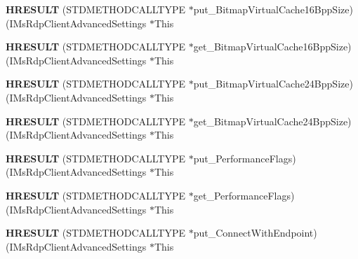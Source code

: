 \begin{DoxyCompactItemize}
{\bfseries H\+R\+E\+S\+U\+LT} (S\+T\+D\+M\+E\+T\+H\+O\+D\+C\+A\+L\+L\+T\+Y\+PE $\ast$put\+\_\+\+Bitmap\+Virtual\+Cache16\+Bpp\+Size)(I\+Ms\+Rdp\+Client\+Advanced\+Settings $\ast$This
\item 
\mbox{\label{struct_i_ms_rdp_client_advanced_settings_vtbl_af89a6a6150667c376bf028de0a6f4245}} 
{\bfseries H\+R\+E\+S\+U\+LT} (S\+T\+D\+M\+E\+T\+H\+O\+D\+C\+A\+L\+L\+T\+Y\+PE $\ast$get\+\_\+\+Bitmap\+Virtual\+Cache16\+Bpp\+Size)(I\+Ms\+Rdp\+Client\+Advanced\+Settings $\ast$This
\item 
\mbox{\label{struct_i_ms_rdp_client_advanced_settings_vtbl_a189c57a9df395151aa237519e09bb79a}} 
{\bfseries H\+R\+E\+S\+U\+LT} (S\+T\+D\+M\+E\+T\+H\+O\+D\+C\+A\+L\+L\+T\+Y\+PE $\ast$put\+\_\+\+Bitmap\+Virtual\+Cache24\+Bpp\+Size)(I\+Ms\+Rdp\+Client\+Advanced\+Settings $\ast$This
\item 
\mbox{\label{struct_i_ms_rdp_client_advanced_settings_vtbl_a1fb865c4695532877e7f2684cab57653}} 
{\bfseries H\+R\+E\+S\+U\+LT} (S\+T\+D\+M\+E\+T\+H\+O\+D\+C\+A\+L\+L\+T\+Y\+PE $\ast$get\+\_\+\+Bitmap\+Virtual\+Cache24\+Bpp\+Size)(I\+Ms\+Rdp\+Client\+Advanced\+Settings $\ast$This
\item 
\mbox{\label{struct_i_ms_rdp_client_advanced_settings_vtbl_aa298f6bbfb386d6c8b8ef7824c1a7a74}} 
{\bfseries H\+R\+E\+S\+U\+LT} (S\+T\+D\+M\+E\+T\+H\+O\+D\+C\+A\+L\+L\+T\+Y\+PE $\ast$put\+\_\+\+Performance\+Flags)(I\+Ms\+Rdp\+Client\+Advanced\+Settings $\ast$This
\item 
\mbox{\label{struct_i_ms_rdp_client_advanced_settings_vtbl_a76b8162d9272e958636bef995271eabf}} 
{\bfseries H\+R\+E\+S\+U\+LT} (S\+T\+D\+M\+E\+T\+H\+O\+D\+C\+A\+L\+L\+T\+Y\+PE $\ast$get\+\_\+\+Performance\+Flags)(I\+Ms\+Rdp\+Client\+Advanced\+Settings $\ast$This
\item 
\mbox{\label{struct_i_ms_rdp_client_advanced_settings_vtbl_a2a520fe1c9ac64abc354033b4dcb2adf}} 
{\bfseries H\+R\+E\+S\+U\+LT} (S\+T\+D\+M\+E\+T\+H\+O\+D\+C\+A\+L\+L\+T\+Y\+PE $\ast$put\+\_\+\+Connect\+With\+Endpoint)(I\+Ms\+Rdp\+Client\+Advanced\+Settings $\ast$This

\end{DoxyCompactItemize}
